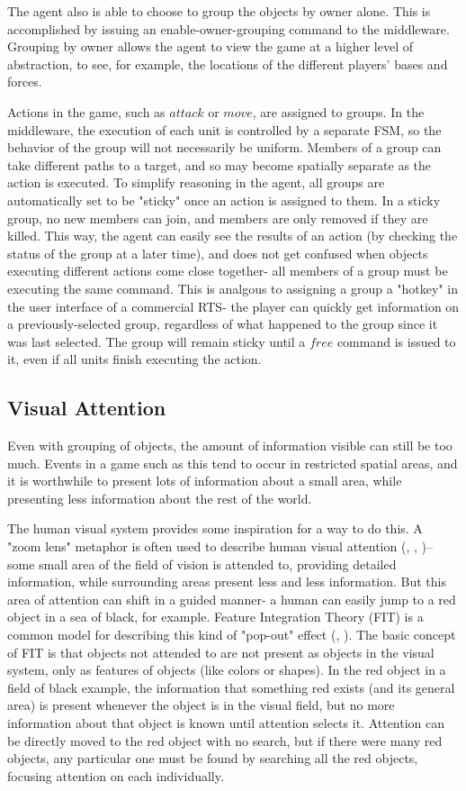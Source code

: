 The agent also is able to choose to group the objects by owner alone. This is accomplished by issuing an enable-owner-grouping command to the middleware. Grouping by owner allows the agent to view the game at a higher level of abstraction, to see, for example, the locations of the different players' bases and forces.

Actions in the game, such as $attack$ or $move$, are assigned to groups. In the middleware, the execution of each unit is controlled by a separate FSM, so the behavior of the group will not necessarily be uniform. Members of a group can take different paths to a target, and so may become spatially separate as the action is executed. To simplify reasoning in the agent, all groups are automatically set to be "sticky" once an action is assigned to them. In a sticky group, no new members can join, and members are only removed if they are killed. This way, the agent can easily see the results of an action (by checking the status of the group at a later time), and does not get confused when objects executing different actions come close together- all members of a group must be executing the same command. This is analgous to assigning a group a "hotkey" in the user interface of a commercial RTS- the player can quickly get information on a previously-selected group, regardless of what happened to the group since it was last selected. The group will remain sticky until a $free$ command is issued to it, even if all units finish executing the action.


\subsection{Visual Attention}

Even with grouping of objects, the amount of information visible can still be too much. Events in a game such as this tend to occur in restricted spatial areas, and it is worthwhile to present lots of information about a small area, while presenting less information about the rest of the world. 

The human visual system provides some inspiration for a way to do this. A "zoom lens" metaphor is often used to describe human visual attention (\cite{zoomlens}, \cite{hill99modeling}, \cite{anderson})-- some small area of the field of vision is attended to, providing detailed information, while surrounding areas present less and less information. But this area of attention can shift in a guided manner- a human can easily jump to a red object in a sea of black, for example. Feature Integration Theory (FIT) is a common model for describing this kind of "pop-out" effect (\cite{fit}, \cite{anderson}). The basic concept of FIT is that objects not attended to are not present as objects in the visual system, only as features of objects (like colors or shapes). In the red object in a field of black example, the information that something red exists (and its general area) is present whenever the object is in the visual field, but no more information about that object is known until attention selects it. Attention can be directly moved to the red object with no search, but if there were many red objects, any particular one must be found by searching all the red objects, focusing attention on each individually.

